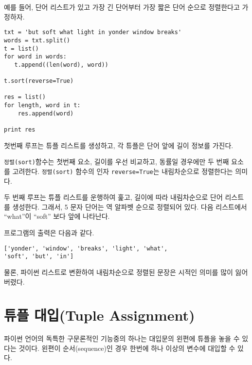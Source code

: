 \label{DSU}

예를 들어, 단어 리스트가 있고 가장 긴 단어부터 가장 짧은 단어 순으로 정렬한다고 가정하자.

\beforeverb
\begin{verbatim}
txt = 'but soft what light in yonder window breaks'
words = txt.split()
t = list()
for word in words:
   t.append((len(word), word))

t.sort(reverse=True)

res = list()
for length, word in t:
    res.append(word)

print res
\end{verbatim}
\afterverb
%

첫번째 루프는 튜플 리스트를 생성하고, 각 튜플은 단어 앞에 길이 정보를 가진다.

{\tt 정렬(sort)}함수는 첫번째 요소, 길이를 우선 비교하고, 동률일 경우에만 두 번째 요소를 고려한다.
{\tt 정렬(sort)} 함수의 인자 {\tt reverse=True}는 내림차순으로 정렬한다는 의미다.


두 번째 루프는 튜플 리스트를 운행하여 훑고, 길이에 따라 내림차순으로 단어 리스트를 생성한다.
그래서, 5 문자 단어는 역 알파벳 순으로 정렬되어 있다. 
다음 리스트에서 ``what''이 ``soft'' 보다 앞에 나타난다.

프로그램의 출력은 다음과 같다.

%
\beforeverb
\begin{verbatim}
['yonder', 'window', 'breaks', 'light', 'what', 
'soft', 'but', 'in']
\end{verbatim}
\afterverb
%

물론, 파이썬 리스트로 변환하여 내림차순으로 정렬된 문장은 시적인 의미를 많이 잃어버렸다.

\section{ 튜플 대입(Tuple Assignment)}
\label{tuple assignment}


파이썬 언어의 독특한 구문론적인 기능중의 하나는 대입문의 왼편에 튜플을 놓을 수 있다는 것이다. 
왼편이 순서(sequence)인 경우 한번에 하나 이상의 변수에 대입할 수 있다.


